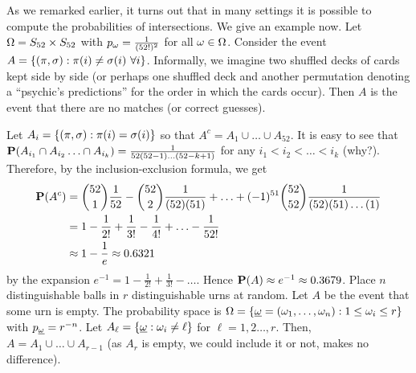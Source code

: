 \documentclass[preprint,  11pt]{amsart}
\def\omeg{\underline{\ome}}
\def\sig{{\sigma}}
\begin{document}

As we remarked earlier,  it turns out that in many settings it is possible to compute the probabilities of intersections. We give an example now.
\beg \label{eg:matchingnumerisnearlypoisson} Let $\Ome=S_{52}\times S_{52}$ with $p_{\ome}=\frac{1}{(52!)^{2}}$ for all $\ome \in \Ome$. Consider the event $A=\{(\pi,\sig)\suchthat \pi(i)\not=\sig(i) \ \forall i\}$. Informally, we imagine two shuffled decks of cards kept side by side (or perhaps one shuffled deck and another permutation denoting a  ``psychic's predictions'' for the order in which the cards occur). Then $A$ is the event that there are no matches (or correct guesses).

Let $A_{i}=\{(\pi,\sig)\suchthat \pi(i)=\sig(i)\}$ so that $A^{c}=A_{1}\cup \ldots \cup A_{52}$. It is easy to see that $\P(A_{i_{1}}\cap A_{i_{2}}\ldots \cap A_{i_{k}})=\frac{1}{52(52-1)\ldots (52-k+1)}$ for any $i_{1}<i_{2}<\ldots <i_{k}$ (why?). Therefore, by the inclusion-exclusion formula, we get
\begin{align*}
\P(A^{c}) &=  \binom{52}{1}\frac{1}{52}-\binom{52}{2}\frac{1}{(52)(51)} +  \ldots + (-1)^{51} \binom{52}{52}\frac{1}{(52)(51)\ldots (1)}\\
&= 1-\frac{1}{2!}+\frac{1}{3!}-\frac{1}{4!}+\ldots -\frac{1}{52!} \\
&\approx 1-\frac{1}{e} \approx 0.6321
\end{align*}
by the expansion $e^{-1}=1-\frac{1}{2!}+\frac{1}{3!}-\ldots $. Hence $\P(A)\approx e^{-1}\approx 0.3679$.
\eeg
\beg\label{eg:probofemptyurn2} Place $n$ distinguishable balls in $r$ distinguishable urns at random. Let $A$ be the event that some urn is empty. The probability space is $\Ome=\{\omeg=(\ome_{1},\ldots,\ome_{n})\suchthat 1\le \ome_{i}\le r\}$ with $p_{\omeg}=r^{-n}$. Let $A_{\ell}=\{\omeg\suchthat \ome_{i}\not=\ell\}$ for $\ell=1,2\ldots ,r$. Then, $A=A_{1}\cup \ldots \cup A_{r-1}$ (as $A_{r}$ is empty, we could include it or not, makes no difference).
\end{document}
